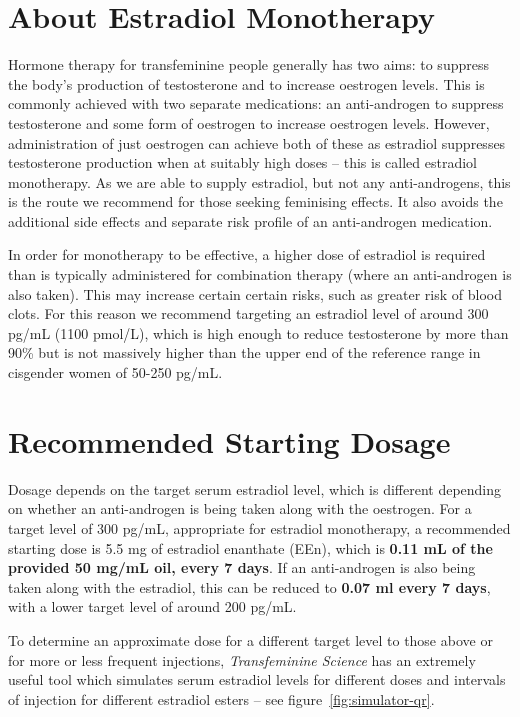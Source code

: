 \documentclass[twoside,a5paper]{article}
\begin{document}
\section{About Estradiol Monotherapy}

Hormone therapy for transfeminine people generally has two aims: to
suppress the body's production of testosterone and to increase
oestrogen levels.  This is commonly achieved with two separate
medications: an anti-androgen to suppress testosterone and some form
of oestrogen to increase oestrogen levels.  However, administration of
just oestrogen can achieve both of these as estradiol suppresses
testosterone production when at suitably high doses -- this is called
estradiol monotherapy.  As we are able to supply estradiol, but not
any anti-androgens, this is the route we recommend for those seeking
feminising effects.  It also avoids the additional side effects and
separate risk profile of an anti-androgen medication.

In order for monotherapy to be effective, a higher dose of estradiol
is required than is typically administered for combination therapy
(where an anti-androgen is also taken).  This may increase certain
certain risks, such as greater risk of blood clots.  For this reason
we recommend targeting an estradiol level of around 300 pg/mL (1100
pmol/L), which is high enough to reduce testosterone by more than 90\%
but is not massively higher than the upper end of the reference range
in cisgender women of 50-250 pg/mL.

\section{Recommended Starting Dosage}

Dosage depends on the target serum estradiol level, which is different
depending on whether an anti-androgen is being taken along with the
oestrogen.  For a target level of 300 pg/mL, appropriate for estradiol
monotherapy, a recommended starting dose is 5.5 mg of estradiol
enanthate (EEn), which is \textbf{0.11 mL of the provided 50 mg/mL
  oil, every 7 days}.  If an anti-androgen is also being taken along
with the estradiol, this can be reduced to \textbf{0.07 ml every 7
  days}, with a lower target level of around 200 pg/mL.

To determine an approximate dose for a different target level to those
above or for more or less frequent injections, \textit{Transfeminine
  Science} has an extremely useful tool which simulates serum
estradiol levels for different doses and intervals of injection for
different estradiol esters -- see figure~\ref{fig:simulator-qr}.
\end{document}
